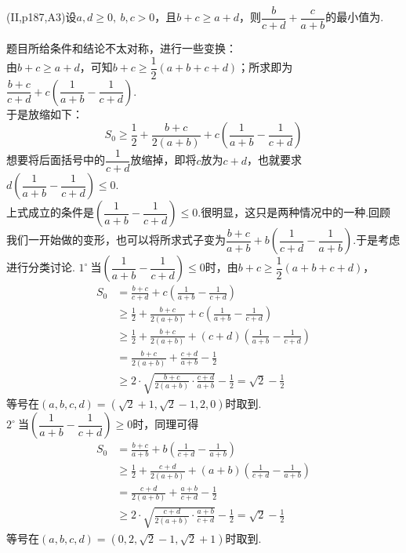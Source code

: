 \documentclass[cn,hazy,black,10pt,normal]{elegantnote}
\newenvironment{guess}{
  \color{guess}}{\newline \color{black}}
\newcommand{\tk}{\uline{\hspace{4em}}}
\newcommand{\ssb}[1]{\left( #1 \right)}
\newcommand{\buzhou}[1]{$#1^{\circ} \ $}
\begin{document}
\begin{problem}
	(II,p187,A3)设$a,d \geq 0,~b,c >0$，且$b+c \geq a+d$，则$\dfrac{b}{c+d}+\dfrac{c}{a+b}$的最小值为\tk .
\end{problem}
\begin{solution}
	\begin{guess}
		题目所给条件和结论不太对称，进行一些变换： \\
		由$b+c \geq a+d$，可知$b+c \geq \dfrac{1}{2}(a+b+c+d)$；所求即为$\dfrac{b+c}{c+d}+c\ssb{\dfrac{1}{a+b}-\dfrac{1}{c+d}}$. \\
		于是放缩如下：$$S_0 \geq \dfrac{1}{2}+\dfrac{b+c}{2(a+b)} + c\ssb{\dfrac{1}{a+b}-\dfrac{1}{c+d}}$$
		想要将后面括号中的$\dfrac{1}{c+d}$放缩掉，即将$c$放为$c+d$，也就要求$d\ssb{\dfrac{1}{a+b}-\dfrac{1}{c+d}} \leq 0$. \\
		上式成立的条件是$\ssb{\dfrac{1}{a+b}-\dfrac{1}{c+d}} \leq 0$.很明显，这只是两种情况中的一种.回顾我们一开始做的变形，也可以将所求式子变为$\dfrac{b+c}{a+b} + b\ssb{\dfrac{1}{c+d}-\dfrac{1}{a+b}}$.于是考虑进行分类讨论.
	\end{guess}
	\buzhou{1}当$\ssb{\dfrac{1}{a+b}-\dfrac{1}{c+d}} \leq 0$时，由$b+c \geq \dfrac{1}{2}(a+b+c+d)$，
	\begin{align*}
		S_0 &= \frac{b+c}{c+d}+c\ssb{\frac{1}{a+b}-\frac{1}{c+d}} \\
		&\geq \frac{1}{2}+\frac{b+c}{2(a+b)} + c\ssb{\frac{1}{a+b}-\frac{1}{c+d}} \\
		&\geq \frac{1}{2}+\frac{b+c}{2(a+b)} + (c+d)\ssb{\frac{1}{a+b}-\frac{1}{c+d}} \\
		&= \frac{b+c}{2(a+b)} + \frac{c+d}{a+b} - \frac{1}{2} \\
		&\geq 2\cdot \sqrt{\frac{b+c}{2(a+b)} \cdot \frac{c+d}{a+b}} - \frac{1}{2} = \sqrt{2} - \frac{1}{2}
	\end{align*}
	等号在$(a,b,c,d)=(\sqrt{2}+1,\sqrt{2}-1,2,0)$时取到. \\
	\buzhou{2}当$\ssb{\dfrac{1}{a+b}-\dfrac{1}{c+d}} \geq 0$时，同理可得
	\begin{align*}
		S_0 &= \frac{b+c}{a+b} + b\ssb{\frac{1}{c+d}-\frac{1}{a+b}} \\
		&\geq \frac{1}{2} + \frac{c+d}{2(a+b)} + (a+b)\ssb{\frac{1}{c+d}-\frac{1}{a+b}} \\
		&= \frac{c+d}{2(a+b)} + \frac{a+b}{c+d} - \frac{1}{2} \\
		&\geq 2\cdot \sqrt{\frac{c+d}{2(a+b)} \cdot \frac{a+b}{c+d}} - \frac{1}{2} = \sqrt{2} - \frac{1}{2}
	\end{align*}
	等号在$(a,b,c,d)=(0,2,\sqrt{2}-1,\sqrt{2}+1)$时取到.
\end{solution}
\end{document}
